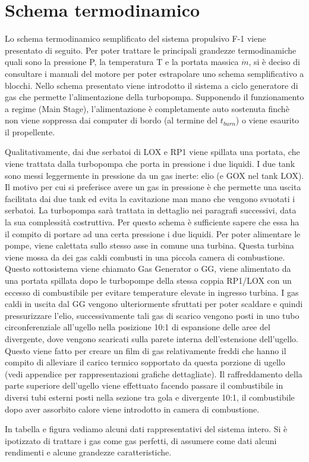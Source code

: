 \section{Schema termodinamico}
\label{sec:schema termodinamico}

Lo schema termodinamico semplificato del sistema propulsivo F-1 viene presentato di seguito. Per poter trattare le principali grandezze termodinamiche quali sono la pressione P, la temperatura T e la portata massica $\dot{m}$, si è deciso di consultare i manuali del motore per poter estrapolare uno schema semplificativo a blocchi. \cite{engine_manual} Nello schema presentato viene introdotto il sistema a ciclo generatore di gas che permette l’alimentazione della turbopompa. Supponendo il funzionamento a regime (Main Stage), l’alimentazione è completamente auto sostenuta finchè non viene soppressa dai computer di bordo (al termine del $t_{burn}$) o viene esaurito il propellente. 

Qualitativamente, dai due serbatoi di LOX e RP1 viene spillata una portata, che viene trattata dalla turbopompa che porta in pressione i due liquidi. I due tank sono messi leggermente in pressione da un gas inerte: elio (e GOX nel tank LOX). Il motivo per cui si preferisce avere un gas in pressione è che permette una uscita facilitata dai due tank ed evita la cavitazione man mano che vengono svuotati i serbatoi. La turbopompa sarà trattata in dettaglio nei paragrafi successivi, data la sua complessità costruttiva. Per questo schema è sufficiente sapere che essa ha il compito di portare ad una certa pressione i due liquidi. Per poter alimentare le pompe, viene calettata sullo stesso asse in comune una turbina. Questa turbina viene mossa da dei gas caldi combusti in una piccola camera di combustione. Questo sottosistema viene chiamato Gas Generator o GG, viene alimentato da una portata spillata dopo le turbopompe della stessa coppia RP1/LOX con un eccesso di combustibile per evitare temperature elevate in ingresso turbina. I gas caldi in uscita dal GG vengono ulteriormente sfruttati per poter scaldare e quindi pressurizzare l’elio, successivamente tali gas di scarico vengono posti in uno tubo circonferenziale all’ugello nella posizione 10:1 di espansione delle aree del divergente, dove vengono scaricati sulla parete interna dell’estensione dell’ugello. Questo viene fatto per creare un film di gas relativamente freddi che hanno il compito di alleviare il carico termico sopportato da questa porzione di ugello (vedi appendice per rappresentazioni grafiche dettagliate). Il raffreddamento della parte superiore dell’ugello viene effettuato facendo passare il combustibile in diversi tubi esterni posti nella sezione tra gola e divergente 10:1, il combustibile dopo aver assorbito calore viene introdotto in camera di combustione. 

In tabella e figura vediamo alcuni dati rappresentativi del sistema intero. Si è ipotizzato di trattare i gas come gas perfetti, di assumere come dati alcuni rendimenti e alcune grandezze caratteristiche. 


